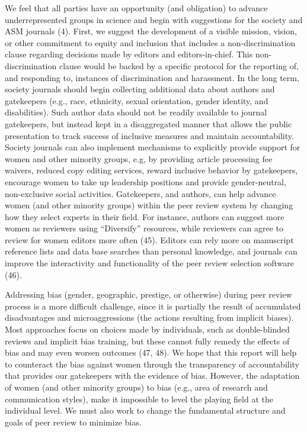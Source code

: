 \documentclass[11pt,]{article}
\begin{document}
We feel that all parties have an opportunity (and obligation) to advance
underrepresented groups in science and begin with suggestions for the
society and ASM journals (4). First, we suggest the development of a
visible mission, vision, or other commitment to equity and inclusion
that includes a non-discrimination clause regarding decisions made by
editors and editors-in-chief. This non-discrimination clause would be
backed by a specific protocol for the reporting of, and responding to,
instances of discrimination and harassment. In the long term, society
journals should begin collecting additional data about authors and
gatekeepers (e.g., race, ethnicity, sexual orientation, gender identity,
and disabilities). Such author data should not be readily available to
journal gatekeepers, but instead kept in a disaggregated manner that
allows the public presentation to track success of inclusive measures
and maintain accountability. Society journals can also implement
mechanisms to explicitly provide support for women and other minority
groups, e.g, by providing article processing fee waivers, reduced copy
editing services, reward inclusive behavior by gatekeepers, encourage
women to take up leadership positions and provide gender-neutral,
non-exclusive social activities. Gatekeepers, and authors, can help
advance women (and other minority groups) within the peer review system
by changing how they select experts in their field. For instance,
authors can suggest more women as reviewers using ``Diversify''
resources, while reviewers can agree to review for women editors more
often (45). Editors can rely more on manuscript reference lists and data
base searches than personal knowledge, and journals can improve the
interactivity and functionality of the peer review selection software
(46).

Addressing bias (gender, geographic, prestige, or otherwise) during peer
review process is a more difficult challenge, since it is partially the
result of accumulated disadvantages and microaggressions (the actions
resulting from implicit biases). Most approaches focus on choices made
by individuals, such as double-blinded reviews and implicit bias
training, but these cannot fully remedy the effects of bias and may even
worsen outcomes (47, 48). We hope that this report will help to
counteract the bias against women through the transparency of
accountability that provides our gatekeepers with the evidence of bias.
However, the adaptation of women (and other minority groups) to bias
(e.g., area of research and communication styles), make it impossible to
level the playing field at the individual level. We must also work to
change the fundamental structure and goals of peer review to minimize
bias.
\end{document}
